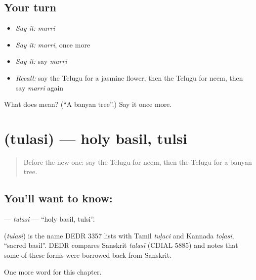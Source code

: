 \subsection*{Your turn}
\begin{itemize}
\raggedright
  \item \emph{Say it:} \emph{marri}
  \item \emph{Say it:} \emph{marri}, once more
  \item \emph{Say it:} say \emph{marri}
  \item \emph{Recall:} say the Telugu for a jasmine flower, then the Telugu for neem, then say \emph{marri} again
\end{itemize}

\begin{tcolorbox}[breakable,colback=teal!4,colframe=teal!35!black,title={Before you move on}]
What does  mean? (\textquotedblleft{}A banyan tree\textquotedblright{}.) Say it once more.
\end{tcolorbox}
\section[\texorpdfstring{\te{తులసి} (tulasi)}{తులసి (tulasi)}]{ (tulasi) — holy basil, tulsi}

\label{lesson:TE-C266-tulasi}



\begin{quote}
Before the new one: say the Telugu for neem, then the Telugu for a banyan tree.
\end{quote}

\subsection*{You'll want to know: }
\textbf{} — \emph{tulasi} — \textquotedblleft{}holy basil, tulsi\textquotedblright{}.

\begin{cousinweb}
\textbf{} (\emph{tulasi}) is the name DEDR 3357 lists with Tamil \emph{tuḷaci} and Kannada \emph{toḷasi}, \textquotedblleft{}sacred basil\textquotedblright{}. DEDR compares Sanskrit \emph{tulasī} (CDIAL 5885) and notes that some of these forms were borrowed back from Sanskrit.
\end{cousinweb}

\begin{grammarlens}[title={What you've built}]
One more word for this chapter.
\end{grammarlens}

